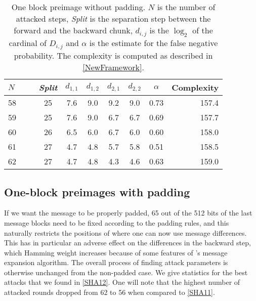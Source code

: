  \begin{table}[htb]
    \caption[One block preimage without padding.]{One block preimage without padding. $N$ is the 
              number of attacked steps, \emph{Split} is the separation step between the
              forward and the backward chunk, $d_{i,j}$ is the $\log_2$ of the cardinal
              of $D_{i,j}$ and $\alpha$ is the estimate for the false negative probability. The complexity
              is computed as described in  \autoref{NewFramework}.\label{SHA11}}
    \begin{center}
      \begin{tabular}{l c c c c c c r @{}} \toprule
        $N\qquad$ &  \emph{Split} & $d_{1,1}$ &  $d_{1,2}$ & $d_{2,1}$ & $d_{2,2}$ & $\alpha $ & Complexity \\\midrule
        58    & 25  & 7.6  & 9.0 & 9.2 & 9.0 & 0.73  & 157.4\\ 
        59    & 25  & 7.6  & 9.0 & 6.7 & 6.7  & 0.69  & 157.7\\ 
        60    & 26  & 6.5 & 6.0 & 6.7 & 6.0  & 0.60  & 158.0\\ 
        61    & 27  & 4.7 & 4.8 & 5.7  & 5.8  & 0.51  & 158.5\\ 
        62    & 27  & 4.7 & 4.8 & 4.3  & 4.6  & 0.63 & 159.0 \\ 
        \bottomrule
        \hline
      \end{tabular}
    \end{center}
  \end{table}

  \subsection{One-block preimages with padding}
\label{sec:one_wi_pad}


  If we want the message to be properly padded, 65 out of the 512 bits of the last message
  blocks need to be fixed according to the padding rules, and this naturally restricts the positions
  of where one can now use message differences. This has in particular an adverse effect on
  the differences in the backward step, which Hamming weight increases because of some
  features of \shaone's message expansion algorithm. The overall process of finding attack
  parameters is otherwise unchanged from the non-padded case. We give statistics for
  the best attacks that we found in \autoref{SHA12}. One will note that the highest number of attacked
  rounds dropped from 62 to 56 when compared to \autoref{SHA11}.
 
